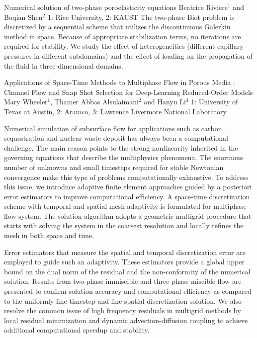 \begin{addmargin}[2em]{0em}
\vspace{1.5ex}
\abs
{Numerical solution of two-phase poroelasticity equations}
{Beatrice Riviere$^{1}$ and Boqian Shen$^{2}$}
{1: Rice University, 2: KAUST}
{The two-phase Biot problem is discretized by a sequential scheme that utilizes the discontinuous Galerkin method in space. Because of appropriate stabilization terms, no iterations are required for stability. We study the effect of heterogeneities (different capillary pressures in different subdomains) and the effect of loading on the propagation of the fluid in three-dimensional domains.}


\vspace{1.5ex}
\abs
{Applications of Space-Time Methods to Multiphase Flow in Porous Media  :  Channel Flow and  Snap Shot Selection for Deep-Learning Reduced-Order Models }
{Mary Wheeler$^{1}$, Thamer  Abbas Alsulaimani$^{2}$ and Hanyu Li$^{3}$}
{1: University of Texas at Austin, 2: Aramco, 3: Lawrence Livermore National Laboratory}
{Numerical simulation of subsurface flow for applications such as carbon sequestration and nuclear waste deposit has always been a computational challenge. The main reason points to the strong nonlinearity inherited in the governing equations that describe the multiphysics phenomena. The enormous number of unknowns and small timesteps required for stable Newtonian convergence make this type of problems computationally exhaustive. To address this issue, we introduce adaptive finite element approaches guided by a posteriori error estimators to improve computational efficiency. A space-time discretization scheme with temporal and spatial mesh adaptivity is formulated for multiphase flow system. The solution algorithm adopts a geometric multigrid procedure that starts with solving the system in the coarsest resolution and locally refines the mesh in both space and time.

Error estimators that measure the spatial and temporal discretization error are employed to guide such an adaptivity. These estimators provide a global upper bound on the dual norm of the residual and the non-conformity of the numerical solution. Results from two-phase immiscible and three-phase miscible flow are presented to confirm solution accuracy and computational efficiency as compared to the uniformly fine timestep and fine spatial discretization solution. We also resolve the common issue of high frequency residuals in multigrid methods by local residual minimization and dynamic advection-diffusion coupling to achieve additional computational speedup and stability.

}
\end{addmargin}
